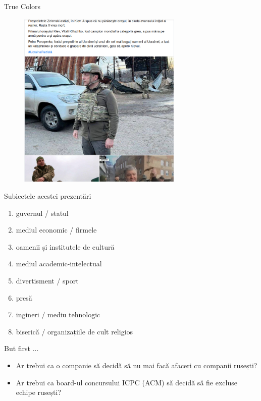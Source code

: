 \documentclass{simple}
\begin{document}
\begin{frame}{True Colors}
  \begin{figure}
    \centering
    \pause
    \includegraphics[width=0.7\textwidth]{img/ukrainian-leaders.png}
  \end{figure}
\end{frame}

\begin{frame}{Subiectele acestei prezentări}
  \begin{enumerate}
    \item guvernul / statul
    \item mediul economic / firmele
    \item oamenii și institutele de cultură
    \item mediul academic-intelectual
    \item divertisment / sport
    \item presă
    \item ingineri / mediu tehnologic
    \item biserică / organizațiile de cult religios
  \end{enumerate}
\end{frame}

\begin{frame}{But first ...}
  \begin{itemize}
    \pause \item Ar trebui ca o companie să decidă să nu mai facă afaceri cu companii rusești?
    \pause \item Ar trebui ca board-ul concursului ICPC (ACM) să decidă să fie excluse echipe rusești?
  \end{itemize}
\end{frame}
\end{document}
